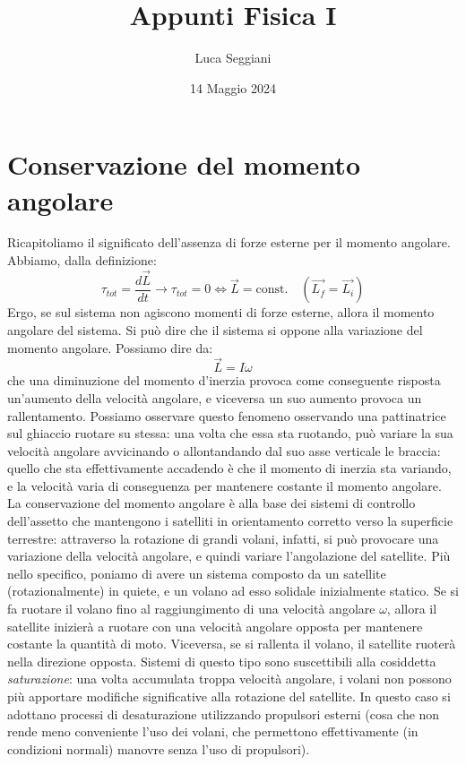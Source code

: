 \documentclass[a4paper,12pt]{article}
\title{Appunti Fisica I}
\author{Luca Seggiani}
\date{14 Maggio 2024}
\begin{document}
\maketitle
\section{Conservazione del momento angolare}
Ricapitoliamo il significato dell'assenza di forze esterne per il momento angolare. Abbiamo, dalla definizione:
$$ \tau_{tot} = \frac{d\vec{L}}{dt} \rightarrow  \tau_{tot} = 0 \Leftrightarrow \vec{L} = \mathrm{const.} \quad (\vec{L_f} = \vec{L_i}) $$
Ergo, se sul sistema non agiscono momenti di forze esterne, allora il momento angolare del sistema. Si può dire che il sistema si oppone alla variazione del momento angolare. Possiamo dire da:
$$ \vec{L} = I\omega $$
che una diminuzione del momento d'inerzia provoca come conseguente risposta un'aumento della velocità angolare, e viceversa un suo aumento provoca un rallentamento. Possiamo osservare questo fenomeno osservando una pattinatrice sul ghiaccio
ruotare su stessa: una volta che essa sta ruotando, può variare la sua velocità angolare avvicinando o allontandando dal suo asse verticale le braccia: quello che sta effettivamente accadendo è che il momento di inerzia sta variando,
e la velocità varia di conseguenza per mantenere costante il momento angolare. \\
La conservazione del momento angolare è alla base dei sistemi di controllo dell'assetto che mantengono i satelliti in orientamento corretto verso la superficie terrestre: attraverso la rotazione di grandi volani, infatti,
si può provocare una variazione della velocità angolare, e quindi variare l'angolazione del satellite. Più nello specifico, poniamo di avere un sistema composto da un satellite (rotazionalmente) in quiete, e un volano ad esso solidale
inizialmente statico. Se si fa ruotare il volano fino al raggiungimento di una velocità angolare $\omega$, allora il satellite inizierà a ruotare con una velocità angolare opposta per mantenere costante la quantità di moto. Viceversa, se si rallenta
il volano, il satellite ruoterà nella direzione opposta. Sistemi di questo tipo sono suscettibili alla cosiddetta \textit{saturazione}: una volta accumulata troppa velocità angolare, i volani non possono più apportare modifiche significative
alla rotazione del satellite. In questo caso si adottano processi di desaturazione utilizzando propulsori esterni (cosa che non rende meno conveniente l'uso dei volani, che permettono effettivamente (in condizioni normali) manovre senza l'uso di propulsori). 
\end{document}
